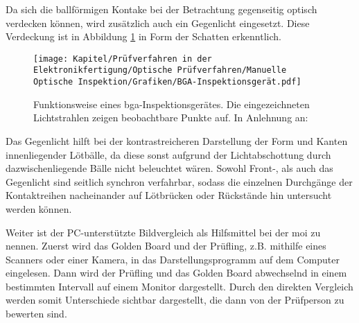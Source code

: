         Da sich die ballförmigen Kontake bei der Betrachtung gegenseitig optisch verdecken können, wird zusätzlich auch ein Gegenlicht eingesetzt.
        Diese Verdeckung ist in Abbildung \ref{Grafik: BGA-Inspektionsgeraet} in Form der Schatten erkenntlich. \cite{berger_test-_2012}

        \begin{figure}[htbp]
            \centering
            \texttt{[image: Kapitel/Prüfverfahren in der Elektronikfertigung/Optische Prüfverfahren/Manuelle Optische Inspektion/Grafiken/BGA-Inspektionsgerät.pdf]}
            \caption[Funktionsweise eines \acs{bga}-Inspektionsgerätes]{Funktionsweise eines \acs{bga}-Inspektionsgerätes. Die eingezeichneten Lichtstrahlen zeigen beobachtbare Punkte auf. In Anlehnung an: \cite{berger_test-_2012}}
            \label{Grafik: BGA-Inspektionsgeraet}
        \end{figure}

        Das Gegenlicht hilft bei der kontrastreicheren Darstellung der Form und Kanten innenliegender Lötbälle, da diese sonst aufgrund der Lichtabschottung durch dazwischenliegende Bälle nicht beleuchtet wären.
        Sowohl Front-, als auch das Gegenlicht sind seitlich synchron verfahrbar, sodass die einzelnen Durchgänge der Kontaktreihen nacheinander auf Lötbrücken oder Rückstände hin untersucht werden können. \cite{berger_test-_2012}

        Weiter ist der PC-unterstützte Bildvergleich als Hilfsmittel bei der \ac{moi} zu nennen.
        Zuerst wird das Golden Board und der Prüfling, z.B. mithilfe eines Scanners oder einer Kamera, in das Darstellungsprogramm auf dem Computer eingelesen.
        Dann wird der Prüfling und das Golden Board abwechselnd in einem bestimmten Intervall auf einem Monitor dargestellt.
        Durch den direkten Vergleich werden somit Unterschiede sichtbar dargestellt, die dann von der Prüfperson zu bewerten sind. \cite{berger_test-_2012}

